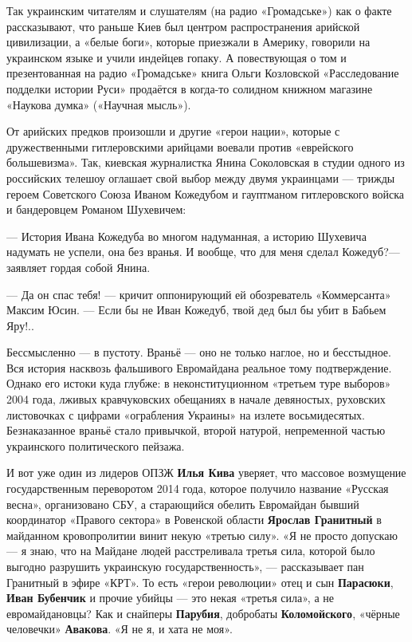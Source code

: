 Так украинским читателям и слушателям (на радио «Громадське») как о факте
рассказывают, что раньше Киев был центром распространения арийской цивилизации,
а «белые боги», которые приезжали в Америку, говорили на украинском языке и
учили индейцев гопаку. А повествующая о том и презентованная на радио
«Громадське» книга Ольги Козловской «Расследование подделки истории Руси»
продаётся в когда-то солидном книжном магазине «Наукова думка» («Научная
мысль»).

От арийских предков произошли и другие «герои нации», которые с дружественными
гитлеровскими арийцами воевали против «еврейского большевизма». Так, киевская
журналистка Янина Соколовская в студии одного из российских телешоу оглашает
свой выбор между двумя украинцами — трижды героем Советского Союза Иваном
Кожедубом и гауптманом гитлеровского войска и бандеровцем Романом Шухевичем:

— История Ивана Кожедуба во многом надуманная, а историю Шухевича надумать не
успели, она без вранья. И вообще, что для меня сделал Кожедуб?— заявляет гордая
собой Янина.

— Да он спас тебя! — кричит оппонирующий ей обозреватель «Коммерсанта» Максим
Юсин. — Если бы не Иван Кожедуб, твой дед был бы убит в Бабьем Яру!..

Бессмысленно — в пустоту. Враньё — оно не только наглое, но и бесстыдное. Вся
история насквозь фальшивого Евромайдана реальное тому подтверждение. Однако его
истоки куда глубже: в неконституционном «третьем туре выборов» 2004 года,
лживых кравчуковских обещаниях в начале девяностых, руховских листовочках с
цифрами «ограбления Украины» на излете восьмидесятых. Безнаказанное враньё
стало привычкой, второй натурой, непременной частью украинского политического
пейзажа.

И вот уже один из лидеров ОПЗЖ \textbf{Илья Кива} уверяет, что массовое возмущение
государственным переворотом 2014 года, которое получило название «Русская
весна», организовано СБУ, а старающийся обелить Евромайдан бывший координатор
«Правого сектора» в Ровенской области \textbf{Ярослав Гранитный} в майданном
кровопролитии винит некую «третью силу». «Я не просто допускаю — я знаю, что на
Майдане людей расстреливала третья сила, которой было выгодно разрушить
украинскую государственность», — рассказывает пан Гранитный в эфире «КРТ». То
есть «герои революции» отец и сын \textbf{Парасюки}, \textbf{Иван Бубенчик} и прочие убийцы — это
некая «третья сила», а не евромайдановцы? Как и снайперы \textbf{Парубия}, добробаты
\textbf{Коломойского}, «чёрные человечки» \textbf{Авакова}. «Я не я, и хата не моя».

